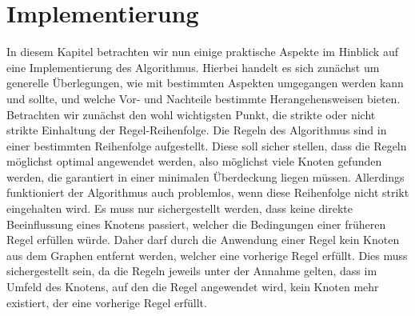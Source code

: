 \documentclass[12pt,onecolumn, notitlepage]{scrartcl}
\begin{document}
\section{Implementierung}\label{sec:Imp}
In diesem Kapitel betrachten wir nun einige praktische Aspekte im Hinblick auf eine Implementierung des Algorithmus. Hierbei handelt es sich zunächst um generelle Überlegungen, wie mit bestimmten Aspekten umgegangen werden kann und sollte, und welche Vor- und Nachteile bestimmte Herangehensweisen bieten.\newline
Betrachten wir zunächst den wohl wichtigsten Punkt, die strikte oder nicht strikte Einhaltung der Regel-Reihenfolge. Die Regeln des Algorithmus sind in einer bestimmten Reihenfolge aufgestellt. Diese soll sicher stellen, dass die Regeln möglichst optimal angewendet werden, also möglichst viele Knoten gefunden werden, die garantiert in einer minimalen Überdeckung liegen müssen.\newline
Allerdings funktioniert der Algorithmus auch problemlos, wenn diese Reihenfolge nicht strikt eingehalten wird. Es muss nur sichergestellt werden, dass keine direkte Beeinflussung eines Knotens passiert, welcher die Bedingungen einer früheren Regel erfüllen würde. Daher darf durch die Anwendung einer Regel kein Knoten aus dem Graphen entfernt werden, welcher eine vorherige Regel erfüllt. Dies muss sichergestellt sein, da die Regeln jeweils unter der Annahme gelten, dass im Umfeld des Knotens, auf den die Regel angewendet wird, kein Knoten mehr existiert, der eine vorherige Regel erfüllt. \newline
\end{document}

